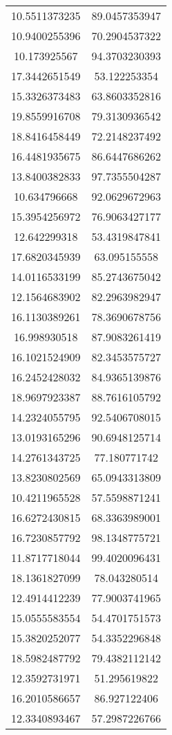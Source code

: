 \begin{table}
\begin{tabular}{cc}
10.5511373235 & 89.0457353947 \\
10.9400255396 & 70.2904537322 \\
10.173925567 & 94.3703230393 \\
17.3442651549 & 53.122253354 \\
15.3326373483 & 63.8603352816 \\
19.8559916708 & 79.3130936542 \\
18.8416458449 & 72.2148237492 \\
16.4481935675 & 86.6447686262 \\
13.8400382833 & 97.7355504287 \\
10.634796668 & 92.0629672963 \\
15.3954256972 & 76.9063427177 \\
12.642299318 & 53.4319847841 \\
17.6820345939 & 63.095155558 \\
14.0116533199 & 85.2743675042 \\
12.1564683902 & 82.2963982947 \\
16.1130389261 & 78.3690678756 \\
16.998930518 & 87.9083261419 \\
16.1021524909 & 82.3453575727 \\
16.2452428032 & 84.9365139876 \\
18.9697923387 & 88.7616105792 \\
14.2324055795 & 92.5406708015 \\
13.0193165296 & 90.6948125714 \\
14.2761343725 & 77.180771742 \\
13.8230802569 & 65.0943313809 \\
10.4211965528 & 57.5598871241 \\
16.6272430815 & 68.3363989001 \\
16.7230857792 & 98.1348775721 \\
11.8717718044 & 99.4020096431 \\
18.1361827099 & 78.043280514 \\
12.4914412239 & 77.9003741965 \\
15.0555583554 & 54.4701751573 \\
15.3820252077 & 54.3352296848 \\
18.5982487792 & 79.4382112142 \\
12.3592731971 & 51.295619822 \\
16.2010586657 & 86.927122406 \\
12.3340893467 & 57.2987226766 \\

\end{tabular}
\end{table}
